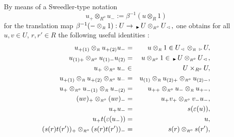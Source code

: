 \documentclass[reqno, a4paper, 10pt]{amsart}
\numberwithin{equation}{section}
\theoremstyle{plain}
\theoremstyle{definition}
\theoremstyle{remark}
\begin{document}
\noindent By means of a Sweedler-type notation 
\begin{equation*}
\label{pm}
		  u_+ \otimes_{{\scriptscriptstyle{{R^{o}}}}} u_- := 
		  \beta^{-1}( u \otimes_{{\scriptscriptstyle{R}}} 1)
\end{equation*}
for the translation map
$
		  \beta^{-1}(- \otimes_{{\scriptscriptstyle{R}}} 1) : U \rightarrow 
		  {}_{{\,\raise1pt\hbox{$\scriptscriptstyle{\blacktriangleright}$} \, }} U \otimes_{{\scriptscriptstyle{{R^{o}}}}} U_{{\,\raise1pt\hbox{$\scriptscriptstyle{\lhd}$} \, }},
$ 
one obtains for all $u, v \in U$, $r, r'\in R$ the following useful identities
\cite[Prop.~3.7]{Schau:DADOQGHA}:
\begin{eqnarray}
\label{Sch1}
u_{+(1)} \otimes_{{\scriptscriptstyle{R}}} u_{+(2)} u_- &=& u \otimes_{{\scriptscriptstyle{R}}} 1 \in U_{{\,\raise1pt\hbox{$\scriptscriptstyle{\lhd}$} \, }} \otimes_{{\scriptscriptstyle{R}}} {}_{{\,\raise1pt\hbox{$\scriptscriptstyle{\rhd}$} \, }} U, \\
\label{Sch2}
u_{(1)+} \otimes_{{\scriptscriptstyle{{R^{o}}}}} u_{(1)-} u_{(2)}  &=& u \otimes_{{\scriptscriptstyle{{R^{o}}}}}  1 \in  {}_{{\,\raise1pt\hbox{$\scriptscriptstyle{\blacktriangleright}$} \, }} U
\otimes_{{\scriptscriptstyle{{R^{o}}}}}  U_{{\,\raise1pt\hbox{$\scriptscriptstyle{\lhd}$} \, }}, \\ 
\label{Sch3}
u_+ \otimes_{{\scriptscriptstyle{{R^{o}}}}}  u_- & \in 
& U \times_{{R^{o}}} U, \\
\label{Sch38}
u_{+(1)} \otimes_{{\scriptscriptstyle{R}}} u_{+(2)} \otimes_{{\scriptscriptstyle{{R^{o}}}}}  u_{-} &=& u_{(1)} \otimes_{{\scriptscriptstyle{R}}}
u_{(2)+} \otimes_{{\scriptscriptstyle{{R^{o}}}}}  u_{(2)-},\\
\label{Sch37}
u_+ \otimes_{{\scriptscriptstyle{{R^{o}}}}}  u_{-(1)} \otimes_{{\scriptscriptstyle{R}}} u_{-(2)} &=& u_{++} \otimes_{{\scriptscriptstyle{{R^{o}}}}}
u_- \otimes_{{\scriptscriptstyle{R}}} u_{+-}, \\
\label{Sch4}
(uv)_+ \otimes_{{\scriptscriptstyle{{R^{o}}}}}  (uv)_- &=& u_+v_+
\otimes_{{\scriptscriptstyle{{R^{o}}}}}  v_-u_-, 
\\ 
\label{Sch47}
u_+u_- &=& {s} (\varepsilon (u)), \\
\label{Sch48}
u_+ {t} (\varepsilon (u_-)) &=& u, \\
\label{Sch5}
({s} (r) {t} (r'))_+ \otimes_{{\scriptscriptstyle{{R^{o}}}}}  ({s} (r) {t} (r') )_- 
&=& {s} (r) \otimes_{{\scriptscriptstyle{{R^{o}}}}}  {s} (r'), 
\end{eqnarray}
\end{document}

